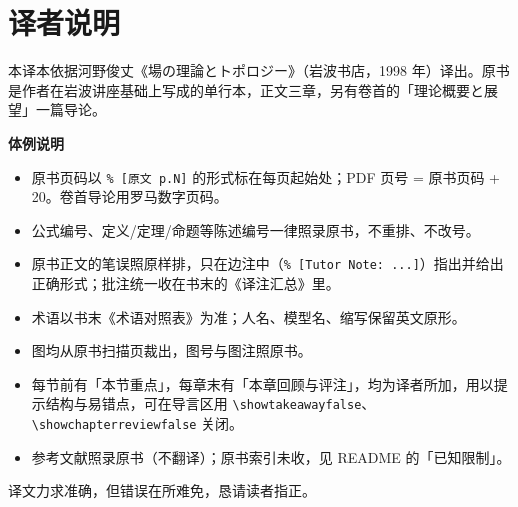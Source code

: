 \chapter*{译者说明}

本译本依据河野俊丈《場の理論とトポロジー》（岩波书店，1998 年）译出。原书是作者在岩波讲座基础上写成的单行本，正文三章，另有卷首的「理论概要と展望」一篇导论。

\medskip
\noindent\textbf{体例说明}
\begin{itemize}[leftmargin=2em,itemsep=2pt]
\item 原书页码以 \verb|% [原文 p.N]| 的形式标在每页起始处；PDF 页号 = 原书页码 + 20。卷首导论用罗马数字页码。
\item 公式编号、定义/定理/命题等陈述编号一律照录原书，不重排、不改号。
\item 原书正文的笔误照原样排，只在边注中（\verb|% [Tutor Note: ...]|）指出并给出正确形式；批注统一收在书末的《译注汇总》里。
\item 术语以书末《术语对照表》为准；人名、模型名、缩写保留英文原形。
\item 图均从原书扫描页裁出，图号与图注照原书。
\item 每节前有「本节重点」，每章末有「本章回顾与评注」，均为译者所加，用以提示结构与易错点，可在导言区用 \verb|\showtakeawayfalse|、\verb|\showchapterreviewfalse| 关闭。
\item 参考文献照录原书（不翻译）；原书索引未收，见 README 的「已知限制」。
\end{itemize}

\medskip
\noindent 译文力求准确，但错误在所难免，恳请读者指正。
